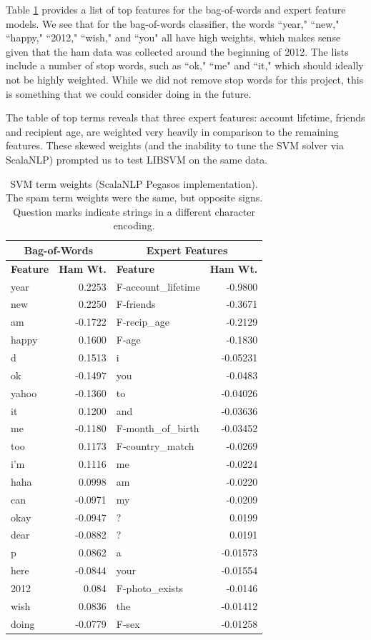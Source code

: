 \documentclass[preprint]{acm_proc_article-sp}
\begin{document}
Table \ref{tab:svmfeats} provides a list of top features for the bag-of-words and expert 
feature models. We see that for the bag-of-words classifier, the words ``year," ``new," ``happy,"  
``2012," ``wish," and ``you" all have high weights, which makes sense given that the ham data was 
collected around the beginning of 2012. The lists include a number of stop words, such as ``ok," 
``me" and ``it," which should ideally not be highly weighted. While we did not remove stop words for this 
project, this is something that we could consider doing in the future. 

The table of top terms reveals that three expert features: account lifetime, friends and 
recipient age, are weighted very heavily in comparison to the remaining features. These 
skewed weights (and the inability to tune the SVM solver via ScalaNLP) prompted us to test LIBSVM 
on the same data.

\begin{table}
\small
\begin{tabular}{l|r||l|r}
\multicolumn{2}{c}{\textbf{Bag-of-Words}} & 
\multicolumn{2}{c}{\textbf{Expert Features}} \\
\hline
\textbf{Feature} & \textbf{Ham Wt.} & \textbf{Feature} & \textbf{Ham Wt.} \\
\hline

year & 0.2253 & F-account\_lifetime & -0.9800\\
new & 0.2250 & F-friends & -0.3671\\
am & -0.1722 & F-recip\_age & -0.2129\\
happy & 0.1600 & F-age & -0.1830\\
d & 0.1513 & i & -0.05231\\
ok & -0.1497 & you & -0.0483\\
yahoo & -0.1360 & to & -0.04026\\
it & 0.1200 & and & -0.03636\\
me & -0.1180 & F-month\_of\_birth & -0.03452\\
too & 0.1173 & F-country\_match & -0.0269\\
i'm & 0.1116 & me & -0.0224\\
haha & 0.0998 & am & -0.0220\\
can & -0.0971 & my & -0.0209\\
okay & -0.0947 & ? & 0.0199\\
dear & -0.0882 & ? & 0.0191\\
p & 0.0862 & a & -0.01573\\
here & -0.0844 & your & -0.01554\\
2012 & 0.084 & F-photo\_exists & -0.0146\\
wish & 0.0836 & the & -0.01412\\
doing & -0.0779 & F-sex & -0.01258\\

\end{tabular}
\caption{SVM term weights (ScalaNLP Pegasos implementation). The spam term weights were the same, but opposite signs.
Question marks indicate strings in a different character encoding.}
\label{tab:svmfeats}
\end{table}
\end{document}
